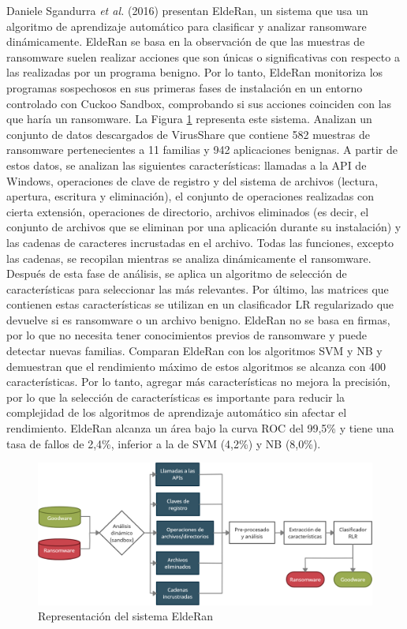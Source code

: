 Daniele Sgandurra \textit{et al.} (2016) \cite{elderan} presentan EldeRan, un sistema que usa un algoritmo de aprendizaje automático para clasificar y analizar ransomware dinámicamente. EldeRan se basa en la observación de que las muestras de ransomware suelen realizar acciones que son únicas o significativas con respecto a las realizadas por un programa benigno. Por lo tanto, EldeRan monitoriza los programas sospechosos en sus primeras fases de instalación en un entorno controlado con Cuckoo Sandbox, comprobando si sus acciones coinciden con las que haría un ransomware. La Figura \ref{fig:elderan} representa este sistema. Analizan un conjunto de datos descargados de VirusShare que contiene 582 muestras de ransomware pertenecientes a 11 familias y 942 aplicaciones benignas. A partir de estos datos, se analizan las siguientes características: llamadas a la \gls{API} de Windows, operaciones de clave de registro y del sistema de archivos (lectura, apertura, escritura y eliminación), el conjunto de operaciones realizadas con cierta extensión, operaciones de directorio, archivos eliminados (es decir, el conjunto de archivos que se eliminan por una aplicación durante su instalación) y las cadenas de caracteres incrustadas en el archivo. Todas las funciones, excepto las cadenas, se recopilan mientras se analiza dinámicamente el ransomware. Después de esta fase de análisis, se aplica un algoritmo de selección de características para seleccionar las más relevantes. Por último, las matrices que contienen estas características se utilizan en un clasificador \gls{LR} regularizado que devuelve si es ransomware o un archivo benigno. EldeRan no se basa en firmas, por lo que no necesita tener conocimientos previos de ransomware y puede detectar nuevas familias. Comparan EldeRan con los algoritmos \gls{SVM} y \gls{NB} y demuestran que el rendimiento máximo de estos algoritmos se alcanza con 400 características. Por lo tanto, agregar más características no mejora la precisión, por lo que la selección de características es importante para reducir la complejidad de los algoritmos de aprendizaje automático sin afectar el rendimiento. EldeRan alcanza un área bajo la curva \gls{ROC} del 99,5\% y tiene una tasa de fallos de 2,4\%, inferior a la de \gls{SVM} (4,2\%) y \gls{NB} (8,0\%).

\begin{figure}[h!]
\begin{center}
\includegraphics[width=1\linewidth]{images/elderan.png}
\end{center}
\caption{Representación del sistema EldeRan \cite{elderan}}
\label{fig:elderan}
\end{figure}

